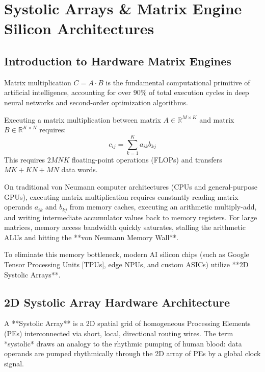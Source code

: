 \chapter{Systolic Arrays \& Matrix Engine Silicon Architectures}
\label{ch:systolic}

\section{Introduction to Hardware Matrix Engines}
Matrix multiplication $C = A \cdot B$ is the fundamental computational primitive of artificial intelligence, accounting for over $90\%$ of total execution cycles in deep neural networks and second-order optimization algorithms.

Executing a matrix multiplication between matrix $A \in \mathbb{R}^{M \times K}$ and matrix $B \in \mathbb{R}^{K \times N}$ requires:
\begin{equation}
c_{ij} = \sum_{k=1}^K a_{ik} b_{kj}
\end{equation}
This requires $2 M N K$ floating-point operations (FLOPs) and transfers $M K + K N + M N$ data words.

On traditional von Neumann computer architectures (CPUs and general-purpose GPUs), executing matrix multiplication requires constantly reading matrix operands $a_{ik}$ and $b_{kj}$ from memory caches, executing an arithmetic multiply-add, and writing intermediate accumulator values back to memory registers. For large matrices, memory access bandwidth quickly saturates, stalling the arithmetic ALUs and hitting the **von Neumann Memory Wall**.

To eliminate this memory bottleneck, modern AI silicon chips (such as Google Tensor Processing Units [TPUs], edge NPUs, and custom ASICs) utilize **2D Systolic Arrays**.

\section{2D Systolic Array Hardware Architecture}
A **Systolic Array** is a 2D spatial grid of homogeneous Processing Elements (PEs) interconnected via short, local, directional routing wires. The term *systolic* draws an analogy to the rhythmic pumping of human blood: data operands are pumped rhythmically through the 2D array of PEs by a global clock signal.

